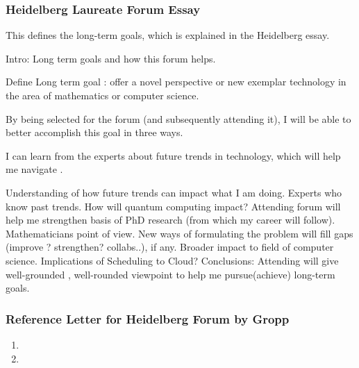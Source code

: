 \begin{frame} 
\frametitle{Heidelberg Laureate Forum Essay}
{\tiny This defines the long-term goals, which is explained in the
  Heidelberg essay}.\\ 
\begin{outline}[enumerate] 
\tiny \1 {\tiny Intro: Long term goals and how this forum helps. } 

\tiny \2 {\tiny Define Long term goal : offer a novel perspective or 
new exemplar technology in the area of mathematics or computer
science.} 

\tiny \2 {\tiny By being selected for the forum (and subsequently
  attending it), I will be able to better accomplish this goal in
  three ways.}
 
\tiny \1 {\tiny I can learn from the experts about future trends in technology, which will help me navigate .} 


\tiny \2 {\tiny Understanding of how future trends can impact what I am doing.} 
\tiny \2 {\tiny Experts who know past trends. How will quantum
  computing impact?} 
\tiny \1 {\tiny Attending forum will help me strengthen basis of PhD research (from which my career will follow). Mathematicians point of view. } 
\tiny \2 {\tiny New ways of formulating the problem will fill gaps
 (improve ? strengthen? collabs..), if any. %
} 
\tiny \1  {\tiny Broader impact to field of computer science. } 
\tiny \2 {\tiny  Implications of Scheduling to Cloud?} 
\tiny \1 {\tiny Conclusions: Attending will give well-grounded ,
  well-rounded viewpoint to help me pursue(achieve) long-term goals.} 
\end{outline}  
\end{frame}


\begin{frame} 
\frametitle{Reference Letter for Heidelberg Forum by Gropp} 
\begin{enumerate} 
\tiny \item \tiny 
\item \tiny 
\end{enumerate}

\end{frame} 


